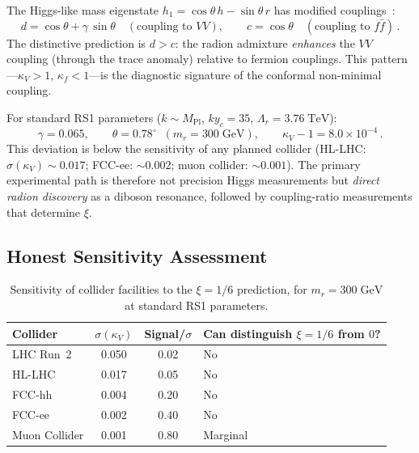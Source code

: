 The Higgs-like mass eigenstate $h_1 = \cos\theta\, h - \sin\theta\, r$ has modified couplings~\cite{ch4:GRW2001}:
\begin{equation}
  d = \cos\theta + \gamma\, \sin\theta \quad (\text{coupling to } VV), \qquad
  c = \cos\theta \quad (\text{coupling to } f\bar{f})\,.
  \label{eq:4-104}
\end{equation}
The distinctive prediction is $d > c$: the radion admixture \emph{enhances} the $VV$ coupling (through the trace anomaly) relative to fermion couplings. This pattern---$\kappa_V > 1$, $\kappa_f < 1$---is the diagnostic signature of the conformal non-minimal coupling.

For standard RS1 parameters ($k \sim M_{\mathrm{Pl}}$, $ky_c = 35$, $\Lambda_r = 3.76\;\mathrm{TeV}$):
\begin{equation}
  \gamma = 0.065, \qquad \theta = 0.78^\circ \;\;(m_r = 300\;\mathrm{GeV}), \qquad
  \kappa_V - 1 = 8.0 \times 10^{-4}\,.
  \label{eq:4-105}
\end{equation}
This deviation is below the sensitivity of any planned collider (HL-LHC: $\sigma(\kappa_V) \sim 0.017$; FCC-ee: $\sim 0.002$; muon collider: $\sim 0.001$). The primary experimental path is therefore not precision Higgs measurements but \emph{direct radion discovery} as a diboson resonance, followed by coupling-ratio measurements that determine $\xi$.

\subsection{Honest Sensitivity Assessment}
\label{sec:4-sensitivity}

\begin{table}[htbp]
\centering
\caption{Sensitivity of collider facilities to the $\xi = 1/6$ prediction, for $m_r = 300\;\mathrm{GeV}$ at standard RS1 parameters.}
\label{tab:4-collider}
\small
\begin{tabular}{@{}lccl@{}}
\toprule
Collider & $\sigma(\kappa_V)$ & Signal/$\sigma$ & Can distinguish $\xi = 1/6$ from $0$? \\
\midrule
LHC Run~2 & 0.050 & 0.02 & No \\
HL-LHC & 0.017 & 0.05 & No \\
FCC-hh & 0.004 & 0.20 & No \\
FCC-ee & 0.002 & 0.40 & No \\
Muon Collider & 0.001 & 0.80 & Marginal \\
\bottomrule
\end{tabular}
\end{table}

